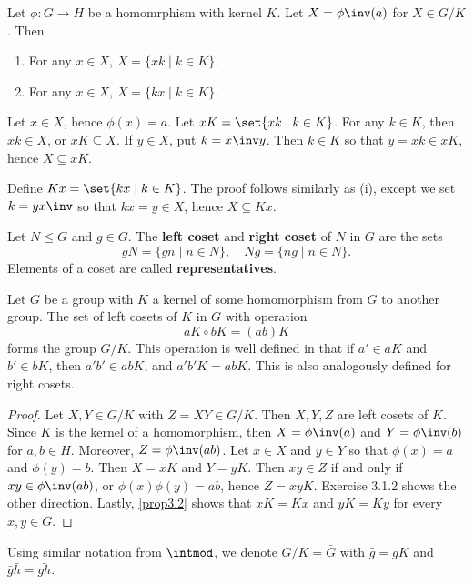  \label{prop3.2}
Let $\phi : G \to H$ be a homomrphism with kernel $K$. Let $X = \phi\inv(a)$ for $X \in G/K$. Then
\begin{enumerate}
    \item For any $x \in X$, $X = \{xk \mid k \in K\}$.
    \item For any $x \in X$, $X = \{kx \mid k \in K\}$.
\end{enumerate}

\begin{proofnum}
    \item Let $x \in X$, hence $\phi(x) = a$. Let $xK = \set{xk \mid k \in K}$. For any $k \in K$, then $xk \in X$, or $xK \subseteq X$. If $y \in X$, put $k = x\inv y$. Then $k \in K$ so that $y = xk \in xK$, hence $X \subseteq xK$.
    \item Define $Kx = \set{kx \mid k \in K}$. The proof follows similarly as (i), except we set $k = yx\inv$ so that $kx = y \in X$, hence $X \subseteq Kx$.
\end{proofnum}

 Let $N \leq G$ and $g \in G$. The \textbf{left coset} and \textbf{right coset} of $N$ in $G$ are the sets
\[gN = \{gn \mid n \in N\}, \quad Ng = \{ng \mid n \in N\}.\]
Elements of a coset are called \textbf{representatives}.

 \label{theo3.3}
Let $G$ be a group with $K$ a kernel of some homomorphism from $G$ to another group. The set of left cosets of $K$ in $G$ with operation
\[aK \circ bK = (ab)K\]
forms the group $G/K$. This operation is well defined in that if $a' \in aK$ and $b' \in bK$, then $a'b' \in abK$, and $a'b'K = abK$. This is also analogously defined for right cosets.
\begin{proof}
    Let $X, Y \in G/K$ with $Z = XY \in G/K$. Then $X, Y, Z$ are left cosets of $K$. Since $K$ is the kernel of a homomorphism, then $X = \phi\inv(a)$ and $Y = \phi\inv(b)$ for $a, b \in H$. Moreover, $Z = \phi\inv(ab)$. Let $x \in X$ and $y \in Y$ so that $\phi(x) = a$ and $\phi(y) = b$. Then $X = xK$ and $Y = yK$. Then $xy \in Z$ if and only if $xy \in \phi\inv(ab)$, or $\phi(x)\phi(y) = ab$, hence $Z = xyK$. Exercise 3.1.2 shows the other direction. Lastly, \autoref{prop3.2} shows that $xK = Kx$ and $yK = Ky$ for every $x, y \in G$.
\end{proof}

\newpage

\note Using similar notation from $\intmod$, we denote $G/K = \bar G$ with $\bar g = gK$ and $\bar g \bar h = \bar{gh}$.

